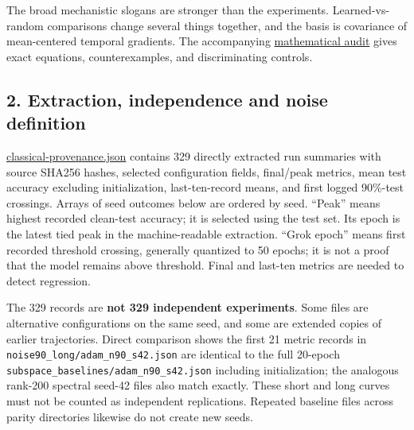 \documentclass[
  british,
  10pt,
  a4paper,
]{article}
\begin{document}
The broad mechanistic slogans are stronger than the
experiments.\allowbreak{} Learned-\allowbreak{}vs-\allowbreak{}random
comparisons change several things together, and the basis is covariance
of mean-\allowbreak{}centered temporal gradients. The accompanying
\hyperref[mathematical-audit]{mathematical audit} gives exact equations,
counterexamp\allowbreak{}les,\allowbreak{} and discriminating controls.

\subsection{\texorpdfstring{2. Extraction,\allowbreak{} independence and
noise
definition}{2.  independence and noise definition}}\label{classical-evidence--extraction-independence-and-noise-definition}

\href{../analysis/classical-provenance.json}{classical-\allowbreak{}provenance.\allowbreak{}json}
contains 329 directly extracted run summaries with source SHA256 hashes,
selected configuration fields, final/peak metrics, mean test accuracy
excluding initializati\allowbreak{}on,\allowbreak{}
last-\allowbreak{}ten-\allowbreak{}record means, and first logged
90\%-test crossings. Arrays of seed outcomes below are ordered by seed.
``Peak'' means highest recorded clean-test accuracy; it is selected
using the test set. Its epoch is the latest tied peak in the
machine-\allowbreak{}readable extraction.\allowbreak{} ``Grok epoch''
means first recorded threshold crossing, generally quantized to 50
epochs; it is not a proof that the model remains above threshold. Final
and last-ten metrics are needed to detect regression.\allowbreak{}

The 329 records are \textbf{not 329 independent experiments}. Some files
are alternative configurations on the same seed, and some are extended
copies of earlier trajectories\allowbreak{}.\allowbreak{} Direct
comparison shows the first 21 metric records in
\texttt{noise90\_\allowbreak{}long/\allowbreak{}adam\_\allowbreak{}n90\_\allowbreak{}s42.\allowbreak{}json}
are identical to the full 20-epoch
\texttt{subspace\_\allowbreak{}baselines/\allowbreak{}adam\_\allowbreak{}n90\_\allowbreak{}s42.\allowbreak{}json}
including initialization; the analogous rank-200 spectral seed-42 files
also match exactly. These short and long curves must not be counted as
independent replications\allowbreak{}.\allowbreak{} Repeated baseline
files across parity directories likewise do not create new seeds.
\end{document}
